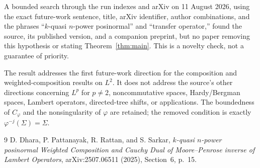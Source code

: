 \documentclass[11pt]{article}
\newcommand{\1}{\mathbf 1}
\begin{document}
A bounded search through the run indexes and arXiv on 11 August 2026, using
the exact future-work sentence, title, arXiv identifier, author combinations,
and the phrases ``$k$-quasi $n$-power posinormal'' and ``transfer operator,''
found the source, its published version, and a companion preprint, but no
paper removing this hypothesis or stating Theorem~\ref{thm:main}.  This is a
novelty check, not a guarantee of priority.

The result addresses the first future-work direction for the composition and
weighted-composition results on $L^2$.  It does not address the source's other
directions concerning $L^p$ for $p\ne2$, noncommutative spaces, Hardy/Bergman
spaces, Lambert operators, directed-tree shifts, or applications.  The
boundedness of $C_\varphi$ and the nonsingularity of $\varphi$ are retained;
the removed condition is exactly $\varphi^{-j}(\Sigma)=\Sigma$.

\begin{thebibliography}{9}
D. Dhara, P. Pattanayak, R. Rattan, and S. Sarkar,
\emph{$k$-quasi $n$-power posinormal Weighted Composition and Cauchy Dual of
Moore--Penrose inverse of Lambert Operators}, arXiv:2507.06511 (2025),
Section~6, p.~15.
\end{thebibliography}
\end{document}

